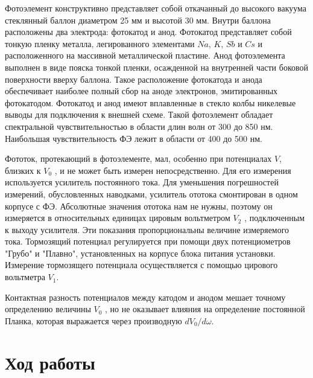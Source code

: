     Фотоэлемент конструктивно представляет собой откачанный до высокого вакуума стеклянный баллон диаметром 25 мм и высотой 30 мм. Внутри баллона расположены два электрода: фотокатод и анод. Фотокатод представляет собой тонкую пленку металла, легированного элементами $Na$, $K$, $Sb$ и $Cs$ и расположенного на массивной металлической пластине. Анод фотоэлемента выполнен в виде пояска тонкой пленки, осажденной на внутренней части боковой поверхности вверху баллона. Такое расположение фотокатода и анода обеспечивает наиболее полный сбор на аноде электронов, эмитированных фотокатодом. Фотокатод и анод имеют вплавленные в стекло колбы никелевые выводы для подключения к внешней схеме. Такой фотоэлемент обладает спектральной чувствительностью в области длин волн от 300 до
    850 нм. Наибольшая чувствительность ФЭ лежит в области от 400 до 500 нм.

    Фототок, протекающий в фотоэлементе, мал, особенно при потенциалах $V$, близких к $V_0$ , и не может быть измерен непосредственно. Для его измерения используется усилитель постоянного тока. Для уменьшения погрешностей измерений, обусловленных наводками, усилитель ототока смонтирован в одном корпусе с ФЭ. Абсолютные значения ототока нам не нужны, поэтому он измеряется в относительных единицах цировым вольтметром $V_2$ , подключенным к выходу усилителя. Эти показания пропорциональны величине измеряемого тока. Тормозящий потенциал регулируется при помощи двух потенциометров "Грубо" и "Плавно", установленных на корпусе блока питания установки. Измерение тормозящего потенциала осуществляется
    с помощью цирового вольтметра $V_1$.

    Контактная разность потенциалов между катодом и анодом мешает точному определению величины $V_0$ , но не оказывает влияния на определение постоянной Планка, которая выражается через производную $dV_0 / d\omega$.
    
\section{Ход работы}

